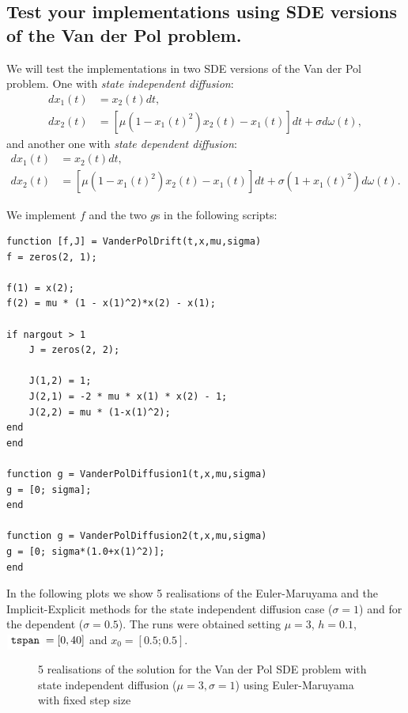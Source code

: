\pagebreak

\subsection{Test your implementations using SDE versions of the Van der Pol problem.}
We will test the implementations in two SDE versions of the Van der Pol problem. One with \textit{state independent diffusion}:
\begin{align*}
    dx_1(t) &= x_2(t)dt, \\
    dx_2(t) &= \left[ \mu (1-x_1(t)^2)x_2(t) - x_1(t) \right] dt + \sigma d\omega (t),
\end{align*}
and another one with \textit{state dependent diffusion}:
\begin{align*}
    dx_1(t) &= x_2(t)dt, \\
    dx_2(t) &= \left[ \mu (1-x_1(t)^2)x_2(t) - x_1(t) \right] dt + \sigma(1+x_1(t)^2) d\omega (t).
\end{align*}

We implement $f$ and the two $g$s in the following scripts:
\begin{lstlisting}
function [f,J] = VanderPolDrift(t,x,mu,sigma)
f = zeros(2, 1);

f(1) = x(2);
f(2) = mu * (1 - x(1)^2)*x(2) - x(1);

if nargout > 1
    J = zeros(2, 2);

    J(1,2) = 1;
    J(2,1) = -2 * mu * x(1) * x(2) - 1;
    J(2,2) = mu * (1-x(1)^2);
end
end

function g = VanderPolDiffusion1(t,x,mu,sigma)
g = [0; sigma];
end

function g = VanderPolDiffusion2(t,x,mu,sigma)
g = [0; sigma*(1.0+x(1)^2)];
end
\end{lstlisting}

In the following plots we show 5 realisations of the Euler-Maruyama and the Implicit-Explicit methods for the state independent diffusion case ($\sigma=1$) and for the dependent ($\sigma=0.5$). The runs were obtained setting $\mu = 3$, $h=0.1$, $\code{tspan} = [0,40]$ and $x_0 = [0.5;0.5]$.

\begin{figure}[H]
    \centering
    \caption{5 realisations of the solution for the Van der Pol SDE problem with state independent diffusion ($\mathit{\mu = 3, \sigma=1}$) using Euler-Maruyama with fixed step size}
    \label{4_5_EulerMaruyama_Independent}
\end{figure}

